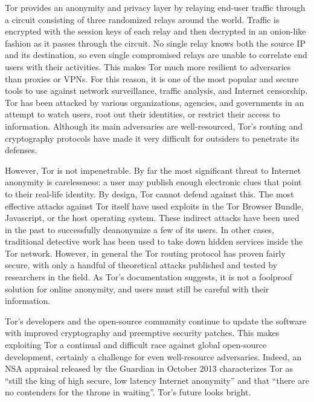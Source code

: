 \documentclass[journal]{IEEEtran}
\begin{document}
Tor provides an anonymity and privacy layer by relaying end-user traffic through a circuit consisting of three randomized relays around the world. Traffic is encrypted with the session keys of each relay and then decrypted in an onion-like fashion as it passes through the circuit. No single relay knows both the source IP and its destination, so even single compromised relays are unable to correlate end users with their activities. This makes Tor much more resilient to adversaries than proxies or VPNs. For this reason, it is one of the most popular and secure tools to use against network surveillance, traffic analysis, and Internet censorship. Tor has been attacked by various organizations, agencies, and governments in an attempt to watch users, root out their identities, or restrict their access to information. Although its main adversaries are well-resourced, Tor's routing and cryptography protocols have made it very difficult for outsiders to penetrate its defenses.

However, Tor is not impenetrable. By far the most significant threat to Internet anonymity is carelessness: a user may publish enough electronic clues that point to their real-life identity. By design, Tor cannot defend against this. The most effective attacks against Tor itself have used exploits in the Tor Browser Bundle, Javascript, or the host operating system. These indirect attacks have been used in the past to successfully deanonymize a few of its users. In other cases, traditional detective work has been used to take down hidden services inside the Tor network. However, in general the Tor routing protocol has proven fairly secure, with only a handful of theoretical attacks published and tested by researchers in the field. As Tor's documentation suggests, it is not a foolproof solution for online anonymity, and users must still be careful with their information.

Tor's developers and the open-source community continue to update the software with improved cryptography and preemptive security patches. This makes exploiting Tor a continual and difficult race against global open-source development, certainly a challenge for even well-resource adversaries. Indeed, an NSA appraisal released by the Guardian in October 2013 characterizes Tor as ``still the king of high secure, low latency Internet anonymity'' and that ``there are no contenders for the throne in waiting''. Tor's future looks bright.

\end{document}

